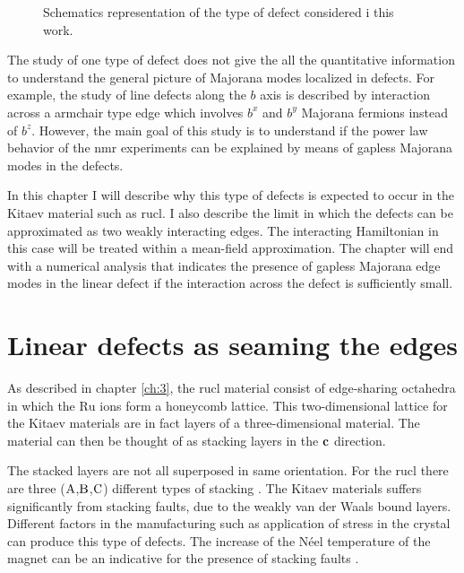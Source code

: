 \begin{figure}[t]  
    \centering
    \hspace*{-11mm}
    \scalebox{1.2}{}%
    \hspace{11mm}
    \caption{Schematics representation of the type of defect considered i this work.}%
    \label{fig:4-defect}%
\end{figure}

The study of one type of defect does not give the all the quantitative information to understand the general picture of Majorana modes localized in defects. For example, the study of line defects along the $b$ axis is described by interaction across a armchair type edge which involves $b^x$ and $b^y$ Majorana fermions instead of $b^z$. However, the main goal of this study is to understand if the power law behavior of the \acrshort{nmr} experiments can be explained by means of gapless Majorana modes in the defects.

In this chapter I will describe why this type of defects is expected to occur in the Kitaev material such as \acrshort{rucl}. I also describe the limit in which the defects can be approximated as two weakly interacting edges. The interacting Hamiltonian in this case will be treated within a mean-field approximation. %
The chapter will end with a numerical analysis that indicates the presence of gapless Majorana edge modes in the linear defect if the interaction across the defect is sufficiently small. 

\section{Linear defects as seaming the edges}

As described in chapter \ref{ch:3}, the \acrshort{rucl} material consist of edge-sharing octahedra in which the $\mathrm{Ru}$ ions form a honeycomb lattice. This two-dimensional lattice for the Kitaev materials are in fact layers of a three-dimensional material. The material can then be thought of as stacking layers in the $\bf{c}$ direction.

The stacked layers are not all superposed in same orientation. For the \acrshort{rucl} there are three ($\rm{A}$,$\rm{B}$,$\rm{C}$) different types of stacking \cite{Kim_Kee_2016}. %
The Kitaev materials suffers significantly from stacking faults, due to the weakly van der Waals bound layers\cite{Banerjee_2016,Cao_2016,Johnson_2015}. Different factors in the manufacturing such as application of stress in the crystal can produce this type of defects. %
The increase of the Néel temperature of the magnet can be an indicative for the presence of stacking faults \cite{Cao_2016,Yamauchi-2018}.


